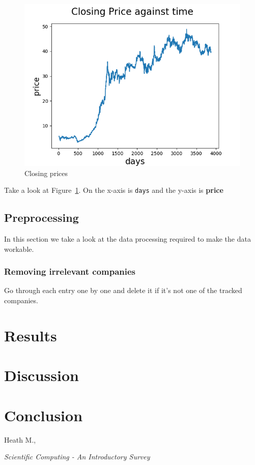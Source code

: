\documentclass[8pt]{article}
\begin{document}
	\begin{figure}[h]
		\centering
		\includegraphics{ap_closing_price.png}
		\caption{Closing prices}
		\label{fig:close_price_graph}
	\end{figure}

	Take a look at Figure~\ref{fig:close_price_graph}. On the x-axis is
	\texttt{days} and the y-axis is \textbf{price}
	\subsection{Preprocessing}
	In this section we take a look at the data processing required to make the
	data workable.
		\subsubsection{Removing irrelevant companies}
		Go through each entry one by one and delete it if it's not one of the tracked companies.

	\section{Results}
	\section{Discussion}
	\section{Conclusion}
	\begin{thebibliography}{9}
			Heath M.,

			\textit{Scientific Computing - An Introductory Survey}
	\end{thebibliography}
\end{document}
